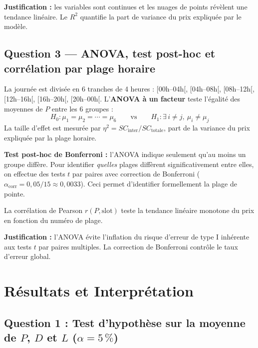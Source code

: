 \documentclass[11pt,a4paper]{article}
\begin{document}
\textbf{Justification :} les variables sont continues et les nuages de points révèlent une tendance linéaire.
Le $R^2$ quantifie la part de variance du prix expliquée par le modèle.

\subsection{Question 3 --- ANOVA, test post-hoc et corrélation par plage horaire}

La journée est divisée en 6 tranches de 4 heures : [00h--04h[, [04h--08h[, [08h--12h[, [12h--16h[,
[16h--20h[, [20h--00h[. L'\textbf{ANOVA à un facteur} teste l'égalité des moyennes de $P$ entre les 6 groupes :
\[
H_0 : \mu_1 = \mu_2 = \cdots = \mu_6 \qquad \text{vs} \qquad H_1 : \exists\, i \neq j,\ \mu_i \neq \mu_j
\]
La taille d'effet est mesurée par $\eta^2 = SC_{\text{inter}} / SC_{\text{totale}}$, part de la variance du prix
expliquée par la plage horaire.

\textbf{Test post-hoc de Bonferroni :} l'ANOVA indique seulement qu'au moins un groupe diffère. Pour identifier
\textit{quelles} plages diffèrent significativement entre elles, on effectue des tests $t$ par paires avec
correction de Bonferroni ($\alpha_{\text{corr}} = 0{,}05/15 \approx 0{,}0033$). Ceci permet d'identifier
formellement la plage de pointe.

La corrélation de Pearson $r(P, \text{slot})$ teste la tendance linéaire monotone du prix en fonction du
numéro de plage.

\textbf{Justification :} l'ANOVA évite l'inflation du risque d'erreur de type I inhérente aux tests $t$ par
paires multiples. La correction de Bonferroni contrôle le taux d'erreur global.

\section{Résultats et Interprétation}

\subsection{\texorpdfstring{Question 1 : Test d'hypothèse sur la moyenne de $P$, $D$ et $L$ ($\alpha = 5\,\%$)}{Question 1 : Test d'hypothèse sur la moyenne de P, D et L}}
\end{document}
